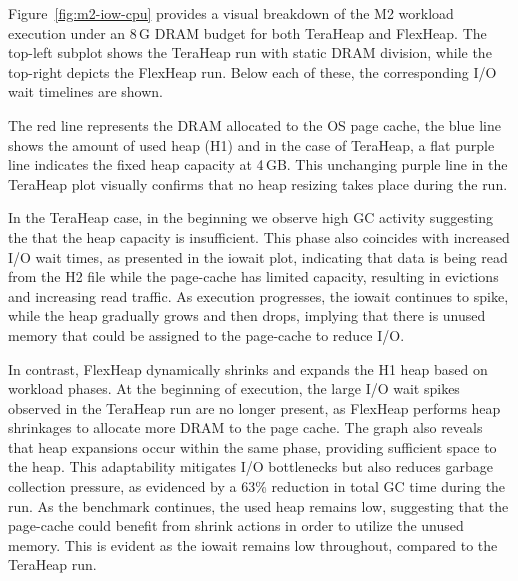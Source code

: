 %


Figure~\ref{fig:m2-iow-cpu} provides a visual breakdown of the M2 workload execution under an
8\,G DRAM budget for both TeraHeap and FlexHeap. The top-left subplot shows the TeraHeap run with static DRAM division, 
while the top-right depicts the FlexHeap run. Below each of these, the corresponding I/O wait timelines are shown.

The red line represents the DRAM allocated to the OS page cache, the blue line shows the
amount of used heap (H1) and in the case of TeraHeap, a flat purple line indicates the fixed heap capacity at 4\,GB. 
This unchanging purple line in the TeraHeap plot visually confirms that no heap resizing takes place during the run. 

In the TeraHeap case, in the beginning we observe high GC activity suggesting the that the heap 
capacity is insufficient. This phase also coincides with increased I/O wait times, as presented in the 
iowait plot, indicating that data is being read from the H2 file while the page-cache has limited capacity,
resulting in evictions and increasing read traffic. As execution progresses, the iowait continues to spike,
while the heap gradually grows and then drops, implying that there is unused memory that could be 
assigned to the page-cache to reduce I/O.

In contrast, FlexHeap dynamically shrinks and expands the H1 heap based on workload phases. 
At the beginning of execution, the large I/O wait spikes observed in the TeraHeap run are no longer present, 
as FlexHeap performs heap shrinkages to allocate more DRAM to the page cache. 
The graph also reveals that heap expansions occur within the same phase, 
providing sufficient space to the heap.
This adaptability mitigates I/O bottlenecks but also reduces garbage collection pressure, 
as evidenced by a 63\% reduction in total GC time during the run.
As the benchmark continues, the used heap remains low, suggesting that the page-cache could 
benefit from shrink actions in order to utilize the unused memory. This is evident as the iowait
remains low throughout, compared to the TeraHeap run.


